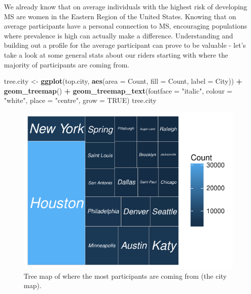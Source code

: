 \documentclass[]{article}
\newenvironment{Shaded}{\begin{snugshade}}{\end{snugshade}}
\newcommand{\KeywordTok}[1]{\textcolor[rgb]{0.13,0.29,0.53}{\textbf{#1}}}
\newcommand{\DataTypeTok}[1]{\textcolor[rgb]{0.13,0.29,0.53}{#1}}
\newcommand{\StringTok}[1]{\textcolor[rgb]{0.31,0.60,0.02}{#1}}
\newcommand{\OtherTok}[1]{\textcolor[rgb]{0.56,0.35,0.01}{#1}}
\newcommand{\OperatorTok}[1]{\textcolor[rgb]{0.81,0.36,0.00}{\textbf{#1}}}
\newcommand{\NormalTok}[1]{#1}
\begin{document}
We already know that on average individuals with the highest risk of
developing MS are women in the Eastern Region of the United States.
Knowing that on average participants have a personal connection to MS,
encouraging populations where prevalence is high can actually make a
difference. Understanding and building out a profile for the average
participant can prove to be valuable - let's take a look at some general
stats about our riders starting with where the majority of participants
are coming from.

\begin{Shaded}
\begin{Highlighting}[]
\NormalTok{tree.city <-}\StringTok{ }\KeywordTok{ggplot}\NormalTok{(top.city, }\KeywordTok{aes}\NormalTok{(}\DataTypeTok{area =}\NormalTok{ Count, }\DataTypeTok{fill =}\NormalTok{ Count, }
    \DataTypeTok{label =}\NormalTok{ City)) }\OperatorTok{+}\StringTok{ }\KeywordTok{geom_treemap}\NormalTok{() }\OperatorTok{+}\StringTok{ }\KeywordTok{geom_treemap_text}\NormalTok{(}\DataTypeTok{fontface =} \StringTok{"italic"}\NormalTok{, }
    \DataTypeTok{colour =} \StringTok{"white"}\NormalTok{, }\DataTypeTok{place =} \StringTok{"centre"}\NormalTok{, }\DataTypeTok{grow =} \OtherTok{TRUE}\NormalTok{)}
\NormalTok{tree.city}
\end{Highlighting}
\end{Shaded}

\begin{figure}
\centering
\includegraphics{index_files/figure-latex/tree-1.pdf}
\caption{Tree map of where the most participants are coming from (the
city map).}
\end{figure}
\end{document}
